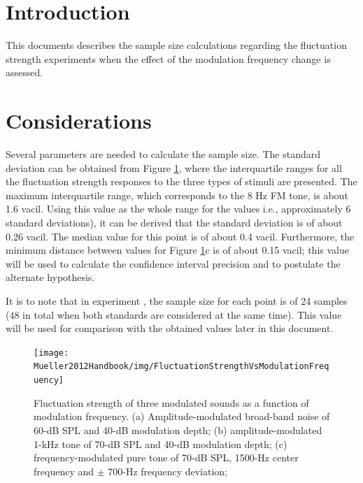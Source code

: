 \documentclass[a4paper]{article}
\begin{document}

\section{Introduction} %
\label{sec:introduction}

This documents describes the sample size calculations regarding the fluctuation
strength experiments when the effect of the modulation frequency change is
assessed.


\section{Considerations} %
\label{sec:considerations}

Several parameters are needed to calculate the sample size. The standard
deviation can be obtained from Figure \ref{fig:fsvsmf}, where the interquartile
ranges for all the fluctuation strength responses to the three types of stimuli
are presented. The maximum interquartile range, which corresponds to the 8 Hz FM
tone, is about 1.6 vacil. Using this value as the whole range for the values
i.e., approximately 6 standard deviations), it can be derived that the standard
deviation is of about 0.26 vacil. The median value for this point is of about
0.4 vacil. Furthermore, the minimum distance between values for Figure
\ref{fig:fsvsmf}c is of about 0.15 vacil; this value will be used to calculate
the confidence interval precision and to postulate the alternate hypothesis.

It is to note that in \citeauthor{Fastl1982Fluctuation} experiment
\cite{Fastl1982Fluctuation}, the sample size for each point is of 24 samples
(48 in total when both standards are considered at the same time). This value
will be used for comparison with the obtained values later in this document.

\begin{figure}[ht]
    \centering
    \texttt{[image: Mueller2012Handbook/img/FluctuationStrengthVsModulationFrequency]}
    \caption{Fluctuation strength of three modulated sounds as a function of
        modulation frequency. (a) Amplitude-modulated broad-band noise of 60-dB
        SPL and 40-dB modulation depth; (b) amplitude-modulated 1-kHz tone of
        70-dB SPL and 40-dB modulation depth; (c) frequency-modulated pure tone
        of 70-dB SPL, 1500-Hz center frequency and $\pm$ 700-Hz frequency
        deviation; \cite[pp. 248]{Fastl2007Psychoacoustics}}
    \label{fig:fsvsmf}
\end{figure}
\end{document}
